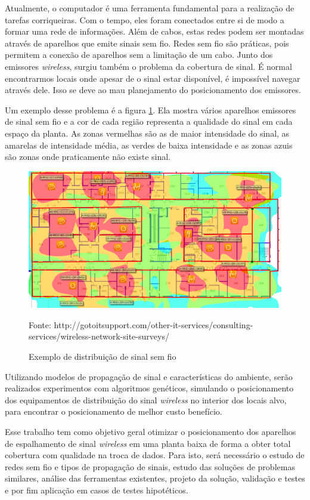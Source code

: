 \documentclass[tc,twoside]{iiufrgs}
\begin{document}
Atualmente, o computador é uma ferramenta fundamental para a realização de tarefas corriqueiras. Com o tempo, eles foram conectados entre si de modo a formar uma rede de informações. Além de cabos, estas redes podem ser montadas através de aparelhos que emite sinais sem fio. Redes sem fio são práticas, pois permitem a conexão de aparelhos sem a limitação de um cabo. Junto dos emissores \textit{wireless}, surgiu também o problema da cobertura de sinal. É normal encontrarmos locais onde apesar de o sinal estar disponível, é impossível navegar através dele. Isso se deve ao mau planejamento do posicionamento dos emissores.

Um exemplo desse problema é a figura \ref{fig:problemaCobertura}. Ela mostra vários aparelhos emissores de sinal sem fio e a cor de cada região representa a qualidade do sinal em cada espaço da planta. As zonas vermelhas são as de maior intensidade do sinal, as amarelas de intensidade média, as verdes de baixa intensidade e as zonas azuis são zonas onde praticamente não existe sinal. 

\begin{figure}[h]
\centering
\includegraphics[scale=0.5]{img/problemaCobertura.png}
\caption{Exemplo de distribuição de sinal sem fio}
Fonte: http://gotoitsupport.com/other-it-services/consulting-services/wireless-network-site-surveys/
\label{fig:problemaCobertura}
\end{figure}

Utilizando modelos de propagação de sinal e características do ambiente, serão realizados experimentos com algoritmos genéticos, simulando o posicionamento dos equipamentos de distribuição do sinal \textit{wireless} no interior dos locais alvo, para encontrar o posicionamento de melhor custo benefício.

Esse trabalho tem como objetivo geral otimizar o posicionamento dos aparelhos de espalhamento de sinal \textit{wireless} em uma planta baixa de forma a obter total cobertura com qualidade na troca de dados. Para isto, será necessário o estudo de redes sem fio e tipos de propagação de sinais, estudo das soluções de problemas similares, análise das ferramentas existentes, projeto da solução, validação e testes e por fim aplicação em casos de testes hipotéticos.
\end{document}
